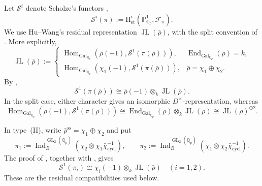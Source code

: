\documentclass[11pt]{article}
\theoremstyle{definition}
\newcommand{\Hom}{\operatorname{Hom}}
\newcommand{\GL}{\operatorname{GL}}
\newcommand{\JL}{\operatorname{JL}}
\begin{document}
Let $\mathcal S^i$ denote Scholze's functors \cite{Scholze2018},
\[
 \mathcal S^i(\pi)
 :=\mathrm H^i_{\mathrm{\acute et}}
   (\mathbb P^1_{\mathbb C_p},\mathcal F_\pi).
\]
We use Hu--Wang's residual representation $\JL(\bar\rho)$, with the
split convention of \cite[Remark~8.36]{HuWangModP}. More explicitly,
\[
 \JL(\bar\rho):=
 \begin{cases}
 \Hom_{\mathrm{Gal}_{\mathbb Q_p}}
   (\bar\rho(-1),\mathcal S^1(\pi(\bar\rho))),
   &\operatorname{End}_{\mathrm{Gal}_{\mathbb Q_p}}(\bar\rho)=k,\\[2pt]
 \Hom_{\mathrm{Gal}_{\mathbb Q_p}}
   (\chi_1(-1),\mathcal S^1(\pi(\bar\rho))),
   &\bar\rho=\chi_1\oplus\chi_2.
 \end{cases}
\]
By \cite[Theorem~4.20]{HuWangPadic},
\[
 \mathcal S^1(\pi(\bar\rho))
 \cong\bar\rho(-1)\otimes_k\JL(\bar\rho).
\]
In the split case, either character gives an isomorphic
$D^\times$-representation, whereas
\[
 \Hom_{\mathrm{Gal}_{\mathbb Q_p}}
 (\bar\rho(-1),\mathcal S^1(\pi(\bar\rho)))
 \cong\operatorname{End}_{\mathrm{Gal}_{\mathbb Q_p}}(\bar\rho)
       \otimes_k\JL(\bar\rho)
 \cong\JL(\bar\rho)^{\oplus2}.
\]

In type~\textup{(II)}, write
$\bar\rho^{\mathrm{ss}}=\chi_1\oplus\chi_2$ and put
\[
 \pi_1:=\operatorname{Ind}_B^{\GL_2(\mathbb Q_p)}
    (\chi_2\otimes\chi_1\bar\chi_{\mathrm{cycl}}^{-1}),\qquad
 \pi_2:=\operatorname{Ind}_B^{\GL_2(\mathbb Q_p)}
    (\chi_1\otimes\chi_2\bar\chi_{\mathrm{cycl}}^{-1}).
\]
The proof of \cite[Theorem~8.12]{HuWangModP}, together with
\cite[Theorem~4.20]{HuWangPadic}, gives
\[
 \mathcal S^1(\pi_i)\cong\chi_i(-1)\otimes_k\JL(\bar\rho)
 \quad(i=1,2).
\]
These are the residual compatibilities used below.
\end{document}
